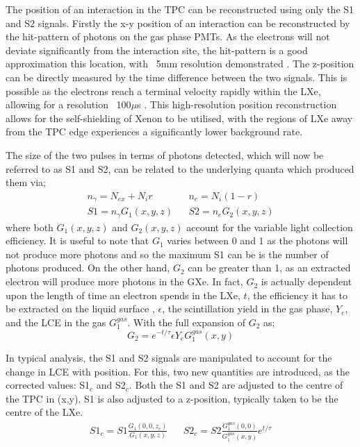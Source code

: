 \par
The position of an interaction in the TPC can be reconstructed using only the S1 and S2 signals.
Firstly the x-y position of an interaction can be reconstructed by the hit-pattern of photons on the gas phase PMTs. 
As the electrons will not deviate significantly from the interaction site, the hit-pattern is a good approximation this location, with ~5mm resolution demonstrated \cite{lux_position_reconstruction_ref}.
The z-position can be directly measured by the time difference between the two signals.
This is possible as the electrons reach a terminal velocity rapidly within the LXe, allowing for a resolution ~100$\mu$s \cite{LZ_TechnicalDesignReview_ref}.
This high-resolution position reconstruction allows for the self-shielding of Xenon to be utilised, with the regions of LXe away from the TPC edge experiences a significantly lower background rate.

\par
The size of the two pulses in terms of photons detected, which will now be referred to as S1 and S2, can be related to the underlying quanta which produced them via;
\begin{align}
    n_\gamma = N_{ex} + N_i r && n_e = N_i (1-r) \\
    S1 = n_\gamma G_1(x,y,z) && S2 = n_e G_2(x,y,z)
\end{align}
where both $G_1(x,y,z)$ and $G_2(x,y,z)$ account for the variable light collection efficiency.
It is useful to note that $G_1$ varies between 0 and 1 as the photons will not produce more photons and so the maximum S1 can be is the number of photons produced.
On the other hand, $G_2$ can be greater than 1, as an extracted electron will produce more photons in the GXe.
In fact, $G_2$ is actually dependent upon the length of time an electron spends in the LXe, $t$, the efficiency it has to be extracted on the liquid surface , $\epsilon$, the scintillation yield in the gas phase, $Y_e$, and the LCE in the gas $G_1^{gas}$.
With the full expansion of $G_2$ as;
\begin{equation}
    G_2 = e^{-t/\tau} \epsilon Y_e G_1^{gas}(x,y)
\end{equation}

\par
In typical analysis, the S1 and S2 signals are manipulated to account for the change in LCE with position.
For this, two new quantities are introduced, as the corrected values: S1$_c$ and S2$_c$.
Both the S1 and S2 are adjusted to the centre of the TPC in (x,y).
S1 is also adjusted to a z-position, typically taken to be the centre of the LXe.
\begin{align}
    S1_c = S1 \frac{G_1(0,0,z_c)}{G_1(x,y,z)} && S2_c = S2 \frac{G_1^{gas}(0,0)}{G_1^{gas}(x,y)} e^{t/\tau}
    \label{eq:s1c_and_s2c_full}
\end{align}


